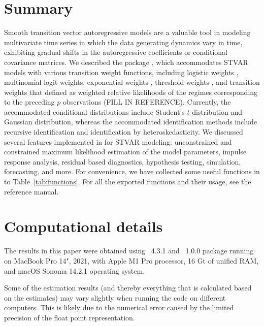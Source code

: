 \documentclass[nojss]{jss}
\begin{document}
\section{Summary}\label{sec:summary}
Smooth transition vector autoregressive models are a valuable tool in modeling multivariate time series in which the data generating dynamics vary in time, exhibiting gradual shifts in the autoregressive coefficients or conditional covariance matrices. We described the  package , which accommodates STVAR models with various transition weight functions, including logistic weights \citep{Anderson+Vahid:1998}, multinomial logit weights, exponential weights \citep[e.g.,][]{Hubrich+Terasvirta:2013}, threshold weights \citep{Tsay:1998}, and transition weights that defined as weighted relative likelihoods of the regimes corresponding to the preceding $p$ observations (FILL IN REFERENCE). Currently, the accommodated conditional distributions include Student's $t$ distribution and Gaussian distribution, whereas the accommodated identification methods include recursive identification and identification by heteroskedasticity. We discussed several features implemented in  for STVAR modeling: unconstrained and constrained maximum likelihood estimation of the model parameters, impulse response analysis, residual based diagnostics, hypothesis testing, simulation, forecasting, and more. For convenience, we have collected some useful functions in  to Table~\ref{tab:functions}. For all the exported functions and their usage, see the reference manual.


\section*{Computational details}
The results in this paper were obtained using ~4.3.1 and ~1.0.0 package running on MacBook Pro 14", 2021, with Apple M1 Pro processor, 16 Gt of unified RAM, and macOS Sonoma 14.2.1 operating system.

Some of the estimation results (and thereby everything that is calculated based on the estimates) may vary slightly when running the code on different computers. This is likely due to the numerical error caused by the limited precision of the float point representation.

\pagebreak

\end{document}
